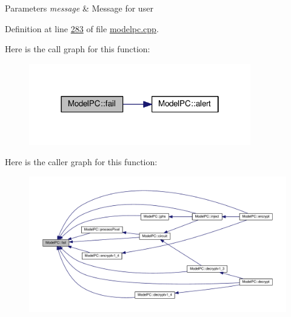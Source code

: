 \begin{DoxyParams}{Parameters}
{\em message} & Message for user \\
\hline
\end{DoxyParams}


Definition at line \hyperlink{modelpc_8cpp_source_l00283}{283} of file \hyperlink{modelpc_8cpp_source}{modelpc.\+cpp}.



Here is the call graph for this function\+:
\nopagebreak
\begin{figure}[H]
\begin{center}
\leavevmode
\includegraphics[width=274pt]{class_model_p_c_a47464b59b7e37fcee25e55475708aabd_cgraph}
\end{center}
\end{figure}




Here is the caller graph for this function\+:
\nopagebreak
\begin{figure}[H]
\begin{center}
\leavevmode
\includegraphics[width=350pt]{class_model_p_c_a47464b59b7e37fcee25e55475708aabd_icgraph}
\end{center}
\end{figure}


